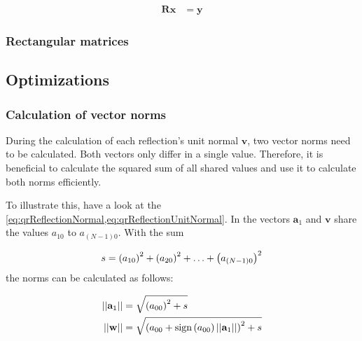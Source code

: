 \begin{align}
\mathbf{R}\mathbf{x} &= \mathbf{y}
\end{align}





\subsubsection{Rectangular matrices}




\subsection{Optimizations}
\label{sec:qrOptimizations}




\subsubsection{Calculation of vector norms}
\label{sec:qrOptimizationsVectorNorms}

During the calculation of each reflection's unit normal $\mathbf{v}$, two vector norms need to be calculated.
Both vectors only differ in a single value.
Therefore, it is beneficial to calculate the squared sum of all shared values and use it to calculate both norms efficiently.

To illustrate this, have a look at the \cref{eq:qrReflectionNormal,eq:qrReflectionUnitNormal}.
In the vectors $\mathbf{a}_1$ and $\mathbf{v}$ share the values $a_{10}$ to $a_{(N-1)0}$.
With the sum 

\begin{align}
s =  \left(a_{10}\right)^2  + \left(a_{20}\right)^2 + \hdots + \left(a_{(N-1)0}\right)^2  
\end{align}
%
the norms can be calculated as follows:

\begin{align}
\left\vert\left\vert\mathbf{a}_1\right\vert\right\vert &= \sqrt{\left(a_{00}\right)^2 + s}\\
\left\vert\left\vert\mathbf{w}\right\vert\right\vert &= \sqrt{\left(a_{00} + \textrm{sign}\left(a_{00}\right) \left\vert\left\vert\mathbf{a}_1\right\vert\right\vert\right)^2 + s}
\end{align}



